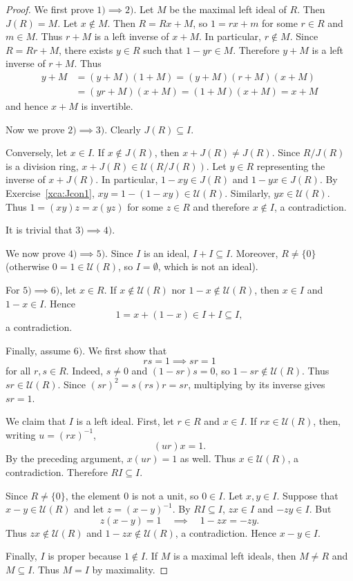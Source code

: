 \begin{proof}
    We first prove $1)\implies2)$. Let $M$ be the maximal left ideal of $R$. Then $J(R)=M$. 
    Let $x\not\in M$. Then $R=Rx+M$, so $1=rx+m$ for some $r\in R$ and $m\in M$. Thus  
    $r+M$ is a left inverse of $x+M$. In particular, 
    $r\not\in M$. Since $R=Rr+M$, there exists $y\in R$ such that $1-yr\in M$. Therefore
    $y+M$ is a left inverse of $r+M$. Thus 
    \begin{align*}
    y+M&=(y+M)(1+M)=(y+M)(r+M)(x+M)\\
    &=(yr+M)(x+M)=(1+M)(x+M)=x+M
    \end{align*}
    and hence $x+M$ is invertible. 

    Now we prove $2)\implies3)$. Clearly $J(R)\subseteq I$. 
    
    Conversely, let $x\in I$. If $x\not\in J(R)$, then
    $x+J(R)\ne J(R)$. Since $R/J(R)$ is a division ring, 
    $x+J(R)\in\mathcal{U}(R/J(R))$. Let 
    $y\in R$ representing the inverse of $x+J(R)$.  
    In particular, $1-xy\in J(R)$ and 
    $1-yx\in J(R)$. By Exercise~\ref{xca:Jcon1}, 
    $xy=1-(1-xy)\in\mathcal{U}(R)$. Similarly, 
    $yx\in\mathcal{U}(R)$. 
    Thus $1=(xy)z=x(yz)$ for some $z\in R$ and therefore $x\not\in I$, a contradiction. 
    
    It is trivial that $3)\implies4)$. 


We now prove $4)\implies5)$. Since $I$ is an ideal,
$I+I\subseteq I$. Moreover, $R\ne\{0\}$ (otherwise
$0=1\in\mathcal{U}(R)$, so $I=\emptyset$, which is not an ideal).

For $5)\implies6)$, let $x\in R$. If $x\not\in\mathcal{U}(R)$ nor
$1-x\not\in\mathcal{U}(R)$, then $x\in I$ and $1-x\in I$. Hence
\[
    1=x+(1-x)\in I+I\subseteq I,
\]
a contradiction. 

Finally, assume $6)$. We first show that
\[
    rs=1\implies sr=1
\]
for all $r,s\in R$. Indeed, $s\ne0$ and
$(1-sr)s=0$, so $1-sr\not\in\mathcal{U}(R)$. Thus 
$sr\in\mathcal{U}(R)$. Since 
$(sr)^2=s(rs)r=sr$, multiplying by its inverse gives
$sr=1$.

We claim that $I$ is a left ideal. First, let $r\in R$
and $x\in I$. If $rx\in\mathcal{U}(R)$, then, writing
$u=(rx)^{-1}$, 
\[
    (ur)x=1.
\]
By the preceding argument, $x(ur)=1$ as well.
Thus $x\in\mathcal{U}(R)$, a contradiction.
Therefore $RI\subseteq I$.

Since $R\ne\{0\}$, the element $0$ is not a unit,
so $0\in I$. Let $x,y\in I$.
Suppose that $x-y\in\mathcal{U}(R)$ and let $z=(x-y)^{-1}$.
By $RI\subseteq I$, $zx\in I$ and $-zy\in I$. 
But
\[
    z(x-y)=1
    \quad\implies\quad
    1-zx=-zy.
\]
Thus $zx\not\in\mathcal{U}(R)$ and $1-zx\not\in\mathcal{U}(R)$, a contradiction. 
Hence $x-y\in I$. 

Finally, $I$ is proper because $1\notin I$. If $M$ is 
a maximal left ideals, then $M\ne R$ and $M\subseteq I$. 
Thus $M=I$ by maximality. 
\end{proof}

